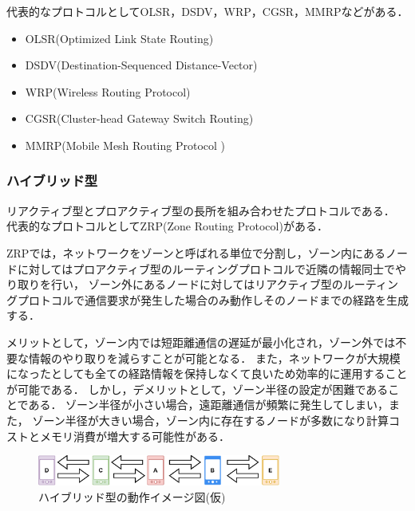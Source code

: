 \documentclass[a4paper, 11pt]{ltjsarticle}
\begin{document}
代表的なプロトコルとしてOLSR，DSDV，WRP，CGSR，MMRPなどがある．

\begin{itemize}
  \item OLSR(Optimized Link State Routing)\cite{OLSR}\\
  \item DSDV(Destination-Sequenced Distance-Vector)\cite{DSDV}\\
  \item WRP(Wireless Routing Protocol)\cite{WRP}\\
  \item CGSR(Cluster-head Gateway Switch Routing)\cite{CGSR}\\
  \item MMRP(Mobile Mesh Routing Protocol )\cite{MMRP}\\
\end{itemize}

\subsubsection{ハイブリッド型}
リアクティブ型とプロアクティブ型の長所を組み合わせたプロトコルである．
代表的なプロトコルとしてZRP(Zone Routing Protocol)\cite{1574231874891177344}がある．

ZRPでは，ネットワークをゾーンと呼ばれる単位で分割し，ゾーン内にあるノードに対してはプロアクティブ型のルーティングプロトコルで近隣の情報同士でやり取りを行い，
ゾーン外にあるノードに対してはリアクティブ型のルーティングプロトコルで通信要求が発生した場合のみ動作しそのノードまでの経路を生成する．

メリットとして，ゾーン内では短距離通信の遅延が最小化され，ゾーン外では不要な情報のやり取りを減らすことが可能となる．
また，ネットワークが大規模になったとしても全ての経路情報を保持しなくて良いため効率的に運用することが可能である．
しかし，デメリットとして，ゾーン半径の設定が困難であることである．
ゾーン半径が小さい場合，遠距離通信が頻繁に発生してしまい，また，
ゾーン半径が大きい場合，ゾーン内に存在するノードが多数になり計算コストとメモリ消費が増大する可能性がある．

\begin{figure}[H]
  \centering
  \includegraphics[width=80mm]{proactive_model.pdf}
  \caption{ハイブリッド型の動作イメージ図(仮)}
  \label{hybrid}
\end{figure}
\end{document}
